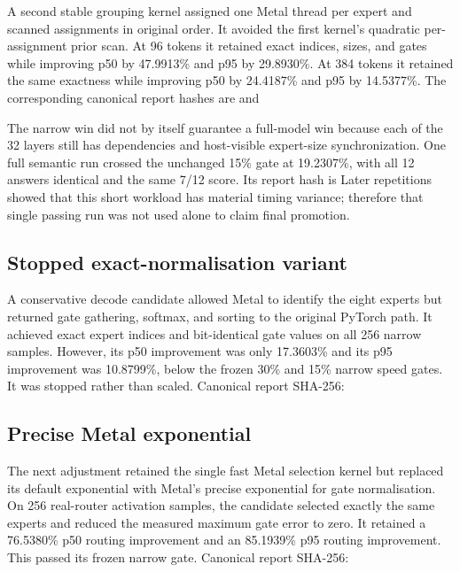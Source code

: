 A second stable grouping kernel assigned one Metal thread per expert and scanned
assignments in original order.  It avoided the first kernel's quadratic
per-assignment prior scan.  At 96 tokens it retained exact indices, sizes, and
gates while improving p50 by 47.9913\% and p95 by 29.8930\%.  At 384 tokens it
retained the same exactness while improving p50 by 24.4187\% and p95 by
14.5377\%.  The corresponding canonical report hashes are
and

The narrow win did not by itself guarantee a full-model win because each of the
32 layers still has dependencies and host-visible expert-size synchronization.
One full semantic run crossed the unchanged 15\% gate at 19.2307\%, with all
12 answers identical and the same 7/12 score.  Its report hash is
Later repetitions showed that this short workload has material timing variance;
therefore that single passing run was not used alone to claim final promotion.

\subsection{Stopped exact-normalisation variant}

A conservative decode candidate allowed Metal to identify the eight experts
but returned gate gathering, softmax, and sorting to the original PyTorch path.
It achieved exact expert indices and bit-identical gate values on all 256 narrow
samples.  However, its p50 improvement was only 17.3603\% and its p95 improvement
was 10.8799\%, below the frozen 30\% and 15\% narrow speed gates.  It was stopped
rather than scaled.  Canonical report SHA-256:

\subsection{Precise Metal exponential}

The next adjustment retained the single fast Metal selection kernel but replaced
its default exponential with Metal's precise exponential for gate normalisation.
On 256 real-router activation samples, the candidate selected exactly the same
experts and reduced the measured maximum gate error to zero.  It retained a
76.5380\% p50 routing improvement and an 85.1939\% p95 routing improvement.
This passed its frozen narrow gate.  Canonical report SHA-256:

